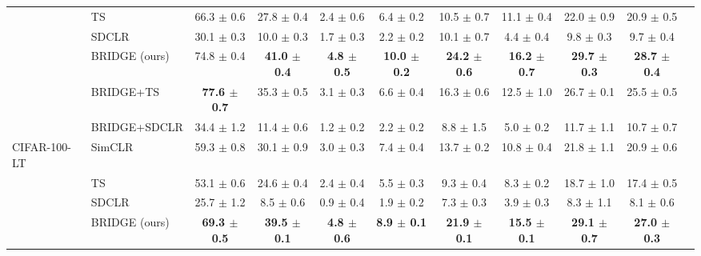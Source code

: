 \begin{table}[t]
\begin{adjustbox}{max width=\textwidth}
\begin{tabular}{l l c c c c c c c c c}
 & TS & 66.3 {\scriptsize$\pm$ 0.6} & 27.8 {\scriptsize$\pm$ 0.4} & 2.4 {\scriptsize$\pm$ 0.6} & 6.4 {\scriptsize$\pm$ 0.2} & 10.5 {\scriptsize$\pm$ 0.7} & 11.1 {\scriptsize$\pm$ 0.4} & 22.0 {\scriptsize$\pm$ 0.9} & 20.9 {\scriptsize$\pm$ 0.5} \\
 & SDCLR & 30.1 {\scriptsize$\pm$ 0.3} & 10.0 {\scriptsize$\pm$ 0.3} & 1.7 {\scriptsize$\pm$ 0.3} & 2.2 {\scriptsize$\pm$ 0.2} & 10.1 {\scriptsize$\pm$ 0.7} & 4.4 {\scriptsize$\pm$ 0.4} & 9.8 {\scriptsize$\pm$ 0.3} & 9.7 {\scriptsize$\pm$ 0.4} \\
\rowcolor{blue!10}  & BRIDGE (ours) & 74.8 {\scriptsize$\pm$ 0.4} & \textbf{41.0 {\scriptsize$\pm$ 0.4}} & \textbf{4.8 {\scriptsize$\pm$ 0.5}} & \textbf{10.0 {\scriptsize$\pm$ 0.2}} & \textbf{24.2 {\scriptsize$\pm$ 0.6}} & \textbf{16.2 {\scriptsize$\pm$ 0.7}} & \textbf{29.7 {\scriptsize$\pm$ 0.3}} & \textbf{28.7 {\scriptsize$\pm$ 0.4}} \\
 & BRIDGE+TS & \textbf{77.6 {\scriptsize$\pm$ 0.7}} & 35.3 {\scriptsize$\pm$ 0.5} & 3.1 {\scriptsize$\pm$ 0.3} & 6.6 {\scriptsize$\pm$ 0.4} & 16.3 {\scriptsize$\pm$ 0.6} & 12.5 {\scriptsize$\pm$ 1.0} & 26.7 {\scriptsize$\pm$ 0.1} & 25.5 {\scriptsize$\pm$ 0.5} \\
 & BRIDGE+SDCLR & 34.4 {\scriptsize$\pm$ 1.2} & 11.4 {\scriptsize$\pm$ 0.6} & 1.2 {\scriptsize$\pm$ 0.2} & 2.2 {\scriptsize$\pm$ 0.2} & 8.8 {\scriptsize$\pm$ 1.5} & 5.0 {\scriptsize$\pm$ 0.2} & 11.7 {\scriptsize$\pm$ 1.1} & 10.7 {\scriptsize$\pm$ 0.7} \\
\midrule
CIFAR-100-LT & SimCLR & 59.3 {\scriptsize$\pm$ 0.8} & 30.1 {\scriptsize$\pm$ 0.9} & 3.0 {\scriptsize$\pm$ 0.3} & 7.4 {\scriptsize$\pm$ 0.4} & 13.7 {\scriptsize$\pm$ 0.2} & 10.8 {\scriptsize$\pm$ 0.4} & 21.8 {\scriptsize$\pm$ 1.1} & 20.9 {\scriptsize$\pm$ 0.6} \\
 & TS & 53.1 {\scriptsize$\pm$ 0.6} & 24.6 {\scriptsize$\pm$ 0.4} & 2.4 {\scriptsize$\pm$ 0.4} & 5.5 {\scriptsize$\pm$ 0.3} & 9.3 {\scriptsize$\pm$ 0.4} & 8.3 {\scriptsize$\pm$ 0.2} & 18.7 {\scriptsize$\pm$ 1.0} & 17.4 {\scriptsize$\pm$ 0.5} \\
 & SDCLR & 25.7 {\scriptsize$\pm$ 1.2} & 8.5 {\scriptsize$\pm$ 0.6} & 0.9 {\scriptsize$\pm$ 0.4} & 1.9 {\scriptsize$\pm$ 0.2} & 7.3 {\scriptsize$\pm$ 0.3} & 3.9 {\scriptsize$\pm$ 0.3} & 8.3 {\scriptsize$\pm$ 1.1} & 8.1 {\scriptsize$\pm$ 0.6} \\
\rowcolor{blue!10}  & BRIDGE (ours) & \textbf{69.3 {\scriptsize$\pm$ 0.5}} & \textbf{39.5 {\scriptsize$\pm$ 0.1}} & \textbf{4.8 {\scriptsize$\pm$ 0.6}} & \textbf{8.9 {\scriptsize$\pm$ 0.1}} & \textbf{21.9 {\scriptsize$\pm$ 0.1}} & \textbf{15.5 {\scriptsize$\pm$ 0.1}} & \textbf{29.1 {\scriptsize$\pm$ 0.7}} & \textbf{27.0 {\scriptsize$\pm$ 0.3}} \\

\end{tabular}
\end{adjustbox}
\end{table}
